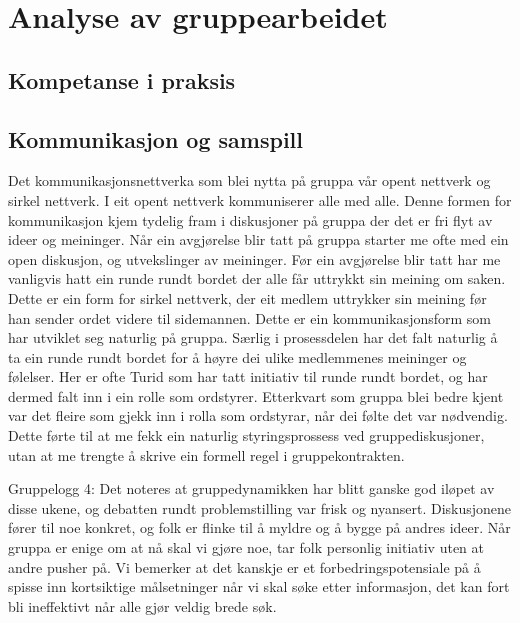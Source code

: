 

\chapter{Analyse av gruppearbeidet}
\section{Kompetanse i praksis}

\section{Kommunikasjon og samspill}
Det kommunikasjonsnettverka som blei nytta på gruppa vår opent nettverk og sirkel nettverk. I eit opent nettverk kommuniserer alle med alle. Denne formen for kommunikasjon kjem tydelig fram i diskusjoner på gruppa der det er fri flyt av ideer og meininger. Når ein avgjørelse blir tatt på gruppa starter me ofte med ein open diskusjon, og utvekslinger av meininger. Før ein avgjørelse blir tatt har me vanligvis hatt ein runde rundt bordet der alle får uttrykkt sin meining om saken. Dette er ein form for sirkel nettverk, der eit medlem uttrykker sin meining før han sender ordet videre til sidemannen. Dette er ein kommunikasjonsform som har utviklet seg naturlig på gruppa. Særlig i prosessdelen har det falt naturlig å ta ein runde rundt bordet for å høyre dei ulike medlemmenes meininger og følelser. Her er ofte Turid som har tatt initiativ til runde rundt bordet, og har dermed falt inn i ein rolle som ordstyrer. Etterkvart som gruppa blei bedre kjent var det fleire som gjekk inn i rolla som ordstyrar, når dei følte det var nødvendig. Dette førte til at me fekk ein naturlig styringsprossess ved gruppediskusjoner, utan at me trengte å skrive ein formell regel i gruppekontrakten.

Gruppelogg 4:
Det noteres at gruppedynamikken har blitt ganske god iløpet av disse ukene, og
debatten rundt problemstilling var frisk og nyansert. Diskusjonene fører til noe
konkret, og folk er flinke til å myldre og å bygge på andres ideer. Når gruppa
er enige om at nå skal vi gjøre noe, tar folk personlig initiativ uten at andre
pusher på. Vi bemerker at det kanskje er et forbedringspotensiale på å spisse
inn kortsiktige målsetninger når vi skal søke etter informasjon, det kan
fort bli ineffektivt når alle gjør veldig brede søk.

